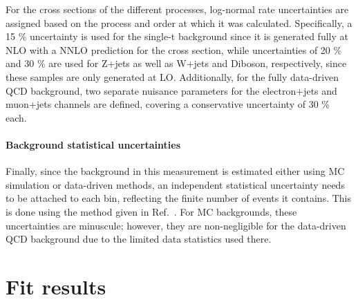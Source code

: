 For the cross sections of the different processes, log-normal rate uncertainties are assigned based on the process and order at which it was calculated. Specifically, a 15 \% uncertainty is used for the single-t background since it is generated fully at NLO with a NNLO prediction for the cross section, while uncertainties of 20 \% and 30 \% are used for Z+jets as well as W+jets and Diboson, respectively, since these samples are only generated at LO. Additionally, for the fully data-driven QCD background, two separate nuisance parameters for the electron+jets and muon+jets channels are defined, covering a conservative uncertainty of 30 \% each.

\paragraph{Background statistical uncertainties}

Finally, since the background in this measurement is estimated either using MC simulation or data-driven methods, an independent statistical uncertainty needs to be attached to each bin, reflecting the finite number of events it contains. This is done using the method given in Ref.~\cite{Barlow:1993dm}. For MC backgrounds, these uncertainties are minuscule; however, they are non-negligible for the data-driven QCD background due to the limited data statistics used there.


\section{Fit results}
\label{sec:ttxs:fitresults}

